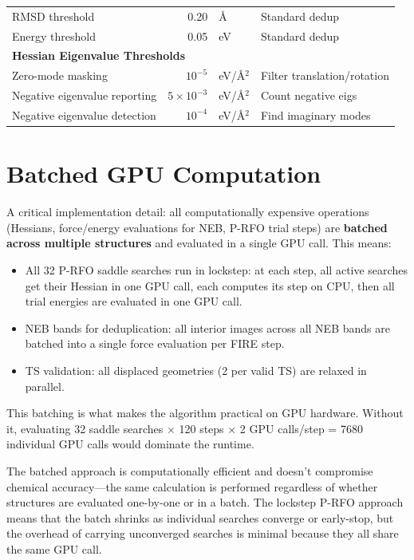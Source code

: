 \documentclass[11pt,a4paper]{article}
\begin{document}
\begin{longtable}{p{5cm}rlp{6cm}}
RMSD threshold & 0.20 & \AA & Standard dedup \\
Energy threshold & 0.05 & eV & Standard dedup \\
\midrule
\multicolumn{4}{l}{\textbf{Hessian Eigenvalue Thresholds}} \\
\midrule
Zero-mode masking & $10^{-5}$ & eV/\AA$^2$ & Filter translation/rotation \\
Negative eigenvalue reporting & $5\times10^{-3}$ & eV/\AA$^2$ & Count negative eigs \\
Negative eigenvalue detection & $10^{-4}$ & eV/\AA$^2$ & Find imaginary modes \\
\end{longtable}


\section{Batched GPU Computation}
\label{sec:batching}

A critical implementation detail: all computationally expensive operations (Hessians, force/energy evaluations for NEB, P-RFO trial steps) are \textbf{batched across multiple structures} and evaluated in a single GPU call. This means:

\begin{itemize}
    \item All 32 P-RFO saddle searches run in lockstep: at each step, all active searches get their Hessian in one GPU call, each computes its step on CPU, then all trial energies are evaluated in one GPU call.
    \item NEB bands for deduplication: all interior images across all NEB bands are batched into a single force evaluation per FIRE step.
    \item TS validation: all displaced geometries (2 per valid TS) are relaxed in parallel.
\end{itemize}

This batching is what makes the algorithm practical on GPU hardware. Without it, evaluating 32 saddle searches $\times$ 120 steps $\times$ 2 GPU calls/step = 7680 individual GPU calls would dominate the runtime.

\begin{evaluation}
The batched approach is computationally efficient and doesn't compromise chemical accuracy---the same calculation is performed regardless of whether structures are evaluated one-by-one or in a batch. The lockstep P-RFO approach means that the batch shrinks as individual searches converge or early-stop, but the overhead of carrying unconverged searches is minimal because they all share the same GPU call.
\end{evaluation}
\end{document}
